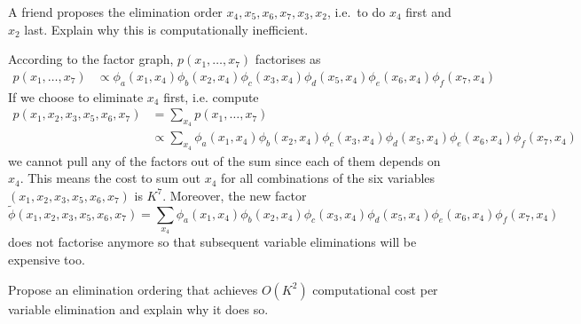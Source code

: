\begin{exenumerate}
\item A friend proposes the elimination order $x_4, x_5, x_6, x_7, x_3, x_2$, i.e.\ to do $x_4$ first and $x_2$ last. Explain why this is computationally inefficient.

  \begin{solution}

    According to the factor graph, $p(x_1, \ldots, x_7)$ factorises as
    \begin{align}
      p(x_1, \ldots, x_7) &\propto \phi_a(x_1,x_4)\phi_b(x_2,x_4)\phi_c(x_3,x_4)\phi_d(x_5,x_4)\phi_e(x_6,x_4)\phi_f(x_7,x_4)
    \end{align}
    If we choose to eliminate $x_4$ first, i.e. compute
    \begin{align}
      p(x_1,x_2,x_3,x_5, x_6, x_7) &= \sum_{x_4}   p(x_1, \ldots, x_7) \\
      & \propto \sum_{x_4} \phi_a(x_1,x_4)\phi_b(x_2,x_4)\phi_c(x_3,x_4)\phi_d(x_5,x_4)\phi_e(x_6,x_4)\phi_f(x_7,x_4)
    \end{align}
    we cannot pull any of the factors out of the sum since each of them depends on $x_4$. This means the
    cost to sum out $x_4$ for all combinations of the six variables
    $(x_1,x_2,x_3,x_5, x_6, x_7)$ is $K^7$. Moreover, the new factor
    \begin{equation}
      \tilde{\phi}(x_1,x_2,x_3,x_5, x_6, x_7) =  \sum_{x_4} \phi_a(x_1,x_4)\phi_b(x_2,x_4)\phi_c(x_3,x_4)\phi_d(x_5,x_4)\phi_e(x_6,x_4)\phi_f(x_7,x_4)
    \end{equation}
    does not factorise anymore so that subsequent variable eliminations will be expensive too.
  \end{solution}
  
\item Propose an elimination ordering that achieves $O(K^2)$ computational cost per variable elimination and explain why it does so.

  \begin{solution}


\end{solution}
\end{exenumerate}
